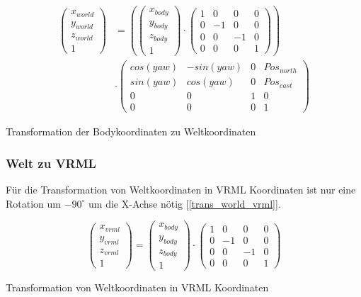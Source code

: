 \begin{ownequation}[H]
\begin{equation}
\begin{split}
\begin{pmatrix}
x_{world} \\ y_{world} \\ z_{world} \\ 1
\end{pmatrix}
& =
\left(
\begin{pmatrix}
x_{body} \\ y_{body} \\ z_{body} \\ 1
\end{pmatrix}
\cdot
\begin{pmatrix}
1 & 0 & 0& 0\\
0 & -1 & 0& 0\\
0 & 0 & -1& 0\\
0 & 0 & 0 & 1
\end{pmatrix}
\right)\\
&\cdot
\begin{pmatrix}
cos(yaw) & -sin(yaw) & 0 & Pos_{north}\\
sin(yaw) & cos(yaw) & 0 & Pos_{east}\\
0 & 0 & 1 & 0\\
0 & 0 & 0 & 1
\end{pmatrix}
\end{split}
\end{equation}
\caption{Transformation der Bodykoordinaten zu Weltkoordinaten}
\label{trans_body_world}
\end{ownequation}

\subsubsection{Welt zu VRML}
Für die Transformation von Weltkoordinaten in VRML Koordinaten ist nur eine Rotation um $-90^\circ$ um die X-Achse nötig [\ref{trans_world_vrml}].
\begin{ownequation}[H]
\begin{equation}
\begin{pmatrix}
x_{vrml}\\y_{vrml}\\z_{vrml}\\1
\end{pmatrix}
=
\begin{pmatrix}
x_{body}\\y_{body}\\z_{body}\\1
\end{pmatrix}
\cdot
\begin{pmatrix}
1 & 0 & 0& 0\\
0 & -1 & 0& 0\\
0 & 0 & -1& 0\\
0 & 0 & 0 & 1
\end{pmatrix}
\end{equation}
\caption{Transformation von Weltkoordinaten in VRML Koordinaten}
\label{trans_world_vrml}
\end{ownequation}